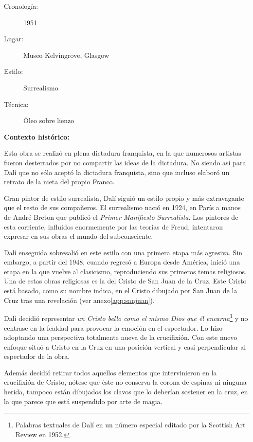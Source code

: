 \begin{description}
\item[Cronología:] 1951
\item[Lugar:] Museo Kelvingrove, Glasgow
\item[Estilo:] Surrealismo
\item[Técnica:] Óleo sobre lienzo
\end{description}

\textbf{Contexto histórico:}

Esta obra se realizó en plena dictadura franquista, en la que numerosos artistas fueron desterrados por no compartir las ideas de la dictadura. No siendo así para Dalí que no sólo aceptó la dictadura franquista, sino que incluso elaboró un retrato de la nieta del propio Franco.

Gran pintor de estilo surrealista, Dalí siguió un estilo propio y más extravagante que el resto de sus compañeros. El surrealismo nació en 1924, en París a manos de André Breton que publicó el \textit{Primer Manifiesto Surrealista}. Los pintores de esta corriente, influidos enormemente por las teorías de Freud, intentaron expresar en sus obras el mundo del subconsciente.\cite{RefWorks:53}

Dalí enseguida sobresalió en este estilo con una primera etapa más agresiva. Sin embargo, a partir del 1948, cuando regresó a Europa desde América, inició una etapa en la que vuelve al clasicismo, reproduciendo sus primeros temas religiosos. Una de estas obras religiosas es la del Cristo de San Juan de la Cruz. Este Cristo está basado, como su nombre indica, en el Cristo dibujado por San Juan de la Cruz tras una revelación (ver anexo\autoref{app:sanjuan}).

Dalí decidió representar \textit{un Cristo bello como el mismo Dios que él encarna}\footnote{Palabras textuales de Dalí en un número especial editado por la Scottish Art Review en 1952.\cite{RefWorks:68}} y no centrase en la fealdad para provocar la emoción en el espectador. Lo hizo adoptando una perspectiva totalmente nueva de la crucifixión. Con este nuevo enfoque situó a Cristo en la Cruz en una posición vertical y casi perpendicular al espectador de la obra.

Además decidió retirar todos aquellos elementos que intervinieron en la crucifixión de Cristo, nótese que éste no conserva la corona de espinas ni ninguna herida, tampoco están dibujados los clavos que lo deberían sostener en la cruz, en la que parece que está suspendido por arte de magia.

